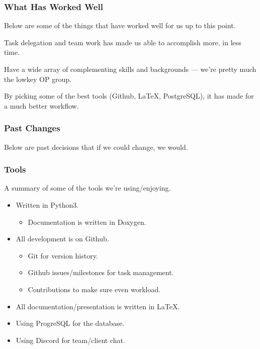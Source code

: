 \documentclass{beamer}
\newcounter{tools}
\begin{document}
\begin{frame}
    \frametitle{What Has Worked Well}
    Below are some of the things that have worked well for us up to this point.

    \begin{description}[<+->]
        \item[Teamwork] Task delegation and team work has made us able to accomplish more, in less time.
        \item[Teammates] Have a wide array of complementing skills and backgrounds --- we're pretty much the lowkey OP group.
        \item[Tools] By picking some of the best tools (Github, \LaTeX{}, PostgreSQL), it has made for a much better workflow.
    \end{description}
\end{frame}


\begin{frame}
    \frametitle{Past Changes}
    Below are past decisions that if we could change, we would. \pause

    \centering
\end{frame}


\begin{frame}
    \frametitle{Tools }
    A summary of some of the tools we're using/enjoying.

    \begin{itemize}
        \item Written in Python3.
        \begin{itemize}
            \item Documentation is written in Doxygen.
        \end{itemize}

        \item All development is on Github.
        \begin{itemize}
            \item Git for version history.
            \item Github issues/milestones for task management.
            \item Contributions to make sure even workload.
        \end{itemize}

        \item All documentation/presentation is written in \LaTeX{}.
        \item Using ProgreSQL for the database.
        \item Using Discord for team/client chat.
    \end{itemize}
\end{frame}
\end{document}
